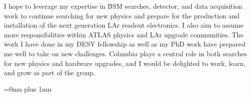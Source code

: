 \documentclass[a4paper]{article}
\begin{document}
I hope to leverage my expertise in BSM searches, detector, and data acquisition work to continue searching for new physics and prepare for
the production and installation of the next generation LAr readout electronics.
I also aim to assume more responsibilities within ATLAS physics and LAr upgrade communities. The work I have done
in my DESY fellowship as well as my PhD work have prepared me well to take on new challenges.
Columbia plays a central role in both searches for new physics and hardware upgrades, and I would be delighted to work,
learn, and grow as part of the group.




\Urlmuskip=0mu plus 1mu\relax
{%
\fontsize{11}{14}
\selectfont
}{}

\end{document}
